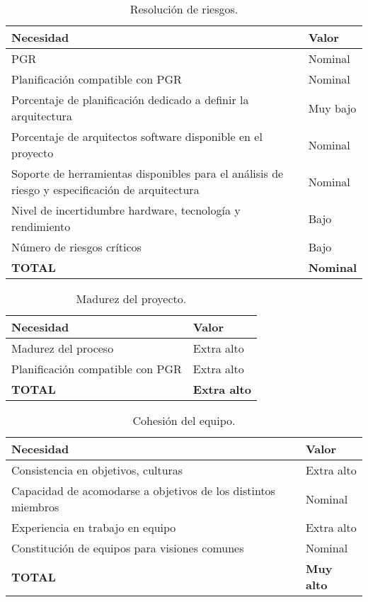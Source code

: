 \begin{table}[h]
\begin{center}
\begin{tabular}{ l l }
\textbf{Necesidad} & \textbf{Valor} \\ \hline
PGR  &
Nominal \\
Planificación compatible con PGR  &
Nominal \\
Porcentaje de planificación dedicado a definir la arquitectura &
Muy bajo \\
Porcentaje de arquitectos software disponible en el proyecto &
Nominal \\
Soporte de herramientas disponibles para el análisis de riesgo y especificación de arquitectura &
Nominal \\
Nivel de incertidumbre hardware, tecnología y rendimiento &
Bajo \\
Número de riesgos críticos &
Bajo \\ \hline
\textbf{TOTAL} & \textbf{Nominal} \\ \hline
\end{tabular}
\caption{Resolución de riesgos.}
\label{tab:riesgos}
\end{center}
\end{table}

\begin{table}[h]
\begin{center}
\begin{tabular}{ l l }
\textbf{Necesidad} & \textbf{Valor} \\ \hline
Madurez del proceso&
Extra alto\\
Planificación compatible con PGR &
Extra alto\\ \hline
\textbf{TOTAL} & \textbf{Extra alto} \\ \hline
\end{tabular}
\caption{Madurez del proyecto.}
\label{tab:madurez}
\end{center}
\end{table}

\begin{table}[h]
\begin{center}
\begin{tabular}{ l l }
\textbf{Necesidad} & \textbf{Valor} \\ \hline
Consistencia en objetivos, culturas &
Extra alto\\
Capacidad de acomodarse a objetivos de los distintos miembros &
Nominal\\
Experiencia en trabajo en equipo &
Extra alto\\
Constitución de equipos para visiones comunes &
Nominal\\ \hline
\textbf{TOTAL} & \textbf{Muy alto} \\ \hline
\end{tabular}
\caption{Cohesión del equipo.}
\label{tab:choseion}
\end{center}
\end{table}

